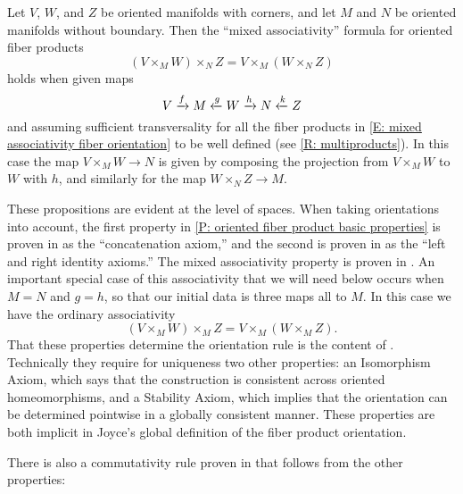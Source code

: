 \begin{proposition}\label{P: oriented fiber mixed associativity}
Let $V$, $W$, and $Z$ be oriented manifolds with corners, and let $M$ and $N$ be oriented manifolds without boundary. Then the ``mixed associativity'' formula for oriented fiber products
\begin{equation}\label{E: mixed associativity fiber orientation}
(V\times_MW)\times_N Z=V\times_M(W\times_N Z)
\end{equation}
holds when given maps 
$$V\xrightarrow{f} M\xleftarrow{g} W\xrightarrow{h} N\xleftarrow{k} Z$$
and assuming sufficient transversality for all the fiber products in \eqref{E: mixed associativity fiber orientation} to be well defined (see \cref{R: multiproducts}). 
 In this case the map $V\times_MW\to N$ is given by composing the projection from $V\times_MW$ to $W$ with $h$, and similarly for the map $W\times_N Z\to M$.
\end{proposition}

These propositions are evident at the level of spaces. When taking orientations into account, the first property in \cref{P: oriented fiber product basic properties} is proven in \cite[Sections 9.3.9]{RamBas09} as the ``concatenation axiom,'' and the second is  proven in \cite[Sections 9.3.5 and 9.3.6]{RamBas09} as the ``left and right identity axioms.''
The mixed associativity property is proven in \cite[Sections 9.3.7]{RamBas09}.
An important special case of this associativity that we will need below occurs when $M=N$ and $g=h$, so that our initial data is three maps all to $M$. In this case we have the ordinary associativity
\begin{equation}\label{E: oriented fiber associativity}
(V\times_MW)\times_M Z=V\times_M(W\times_M Z).
\end{equation}
That these properties determine the orientation rule is the content of \cite[Theorem 9-10]{RamBas09}. Technically they require for uniqueness two other properties: an Isomorphism Axiom, which says that the construction is consistent across oriented homeomorphisms, and a Stability Axiom, which implies that the orientation can be determined pointwise in a globally consistent manner. These properties are both implicit in Joyce's global definition of the fiber product orientation. 

There is also a commutativity rule proven in \cite[Sections 9.3.8]{RamBas09} that follows from the other properties:

